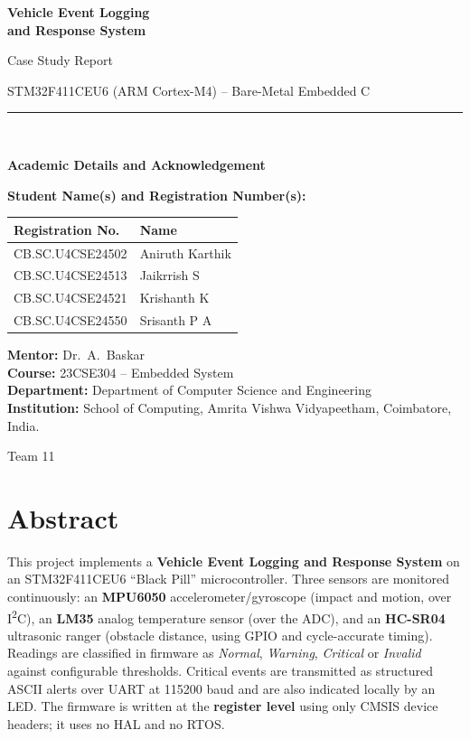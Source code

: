 \documentclass[11pt,a4paper]{article}
\begin{document}
\begin{titlepage}
\centering
\vspace*{1.5cm}
{\Huge\bfseries\color{maroon} Vehicle Event Logging\\[0.2em] and Response System\par}
\vspace{0.8cm}
{\Large Case Study Report\par}
\vspace{0.3cm}
{\large STM32F411CEU6 (ARM Cortex-M4) -- Bare-Metal Embedded C\par}
\vspace{1.6cm}
\rule{0.8\textwidth}{0.6pt}\\[1em]
{\Large\bfseries Academic Details and Acknowledgement\par}
\vspace{1em}
\begin{flushleft}
\textbf{Student Name(s) and Registration Number(s):}
\begin{center}
\begin{tabular}{ll}
\toprule
\textbf{Registration No.} & \textbf{Name}\\
\midrule
CB.SC.U4CSE24502 & Aniruth Karthik\\
CB.SC.U4CSE24513 & Jaikrrish S\\
CB.SC.U4CSE24521 & Krishanth K\\
CB.SC.U4CSE24550 & Srisanth P A\\
\bottomrule
\end{tabular}
\end{center}
\textbf{Mentor:} Dr.\ A.\ Baskar\\[0.3em]
\textbf{Course:} 23CSE304 -- Embedded System\\[0.3em]
\textbf{Department:} Department of Computer Science and Engineering\\[0.3em]
\textbf{Institution:} School of Computing, Amrita Vishwa Vidyapeetham, Coimbatore, India.
\end{flushleft}
\vfill
{\large Team 11}
\end{titlepage}

\tableofcontents
\newpage

\section{Abstract}
This project implements a \textbf{Vehicle Event Logging and Response System} on an STM32F411CEU6 ``Black Pill'' microcontroller. Three sensors are monitored continuously: an \textbf{MPU6050} accelerometer/gyroscope (impact and motion, over I\textsuperscript{2}C), an \textbf{LM35} analog temperature sensor (over the ADC), and an \textbf{HC-SR04} ultrasonic ranger (obstacle distance, using GPIO and cycle-accurate timing). Readings are classified in firmware as \emph{Normal}, \emph{Warning}, \emph{Critical} or \emph{Invalid} against configurable thresholds. Critical events are transmitted as structured ASCII alerts over UART at 115200 baud and are also indicated locally by an LED. The firmware is written at the \textbf{register level} using only CMSIS device headers; it uses no HAL and no RTOS.
\end{document}
